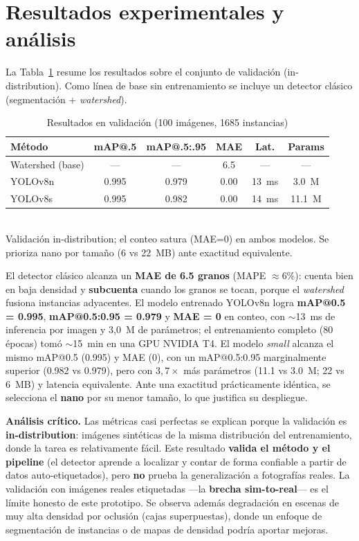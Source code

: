\documentclass[conference]{IEEEtran}
\begin{document}
\section{Resultados experimentales y análisis}
La Tabla~\ref{tab:res} resume los resultados sobre el conjunto de validación
(in-distribution). Como línea de base sin entrenamiento se incluye un detector
clásico (segmentación + \textit{watershed}).

\begin{table}[t]
\caption{Resultados en validación (100 imágenes, 1685 instancias)}
\label{tab:res}
\centering
\begin{tabular}{lccccc}
\toprule
\textbf{Método} & \textbf{mAP@.5} & \textbf{mAP@.5:.95} & \textbf{MAE} & \textbf{Lat.} & \textbf{Params} \\
\midrule
Watershed (base) & --- & --- & 6.5 & --- & --- \\
YOLOv8n & 0.995 & 0.979 & 0.00 & 13~ms & 3.0~M \\
YOLOv8s & 0.995 & 0.982 & 0.00 & 14~ms & 11.1~M \\
\bottomrule
\end{tabular}
\\[2pt]
\footnotesize Validación in-distribution; el conteo satura (MAE=0) en ambos
modelos. Se prioriza nano por tamaño (6 vs 22~MB) ante exactitud equivalente.
\end{table}

El detector clásico alcanza un \textbf{MAE de 6.5 granos} (MAPE $\approx$6\%):
cuenta bien en baja densidad y \textbf{subcuenta} cuando los granos se tocan,
porque el \textit{watershed} fusiona instancias adyacentes. El modelo entrenado
YOLOv8n logra \textbf{mAP@0.5 = 0.995}, \textbf{mAP@0.5:0.95 = 0.979} y
\textbf{MAE = 0} en conteo, con $\sim$13~ms de inferencia por imagen y 3{,}0~M de
parámetros; el entrenamiento completo (80 épocas) tomó $\sim$15~min en una GPU
NVIDIA T4. El modelo \textit{small} alcanza el mismo mAP@0.5 (0.995) y MAE (0), con un
mAP@0.5:0.95 marginalmente superior (0.982 vs 0.979), pero con $3{,}7\times$ más
parámetros (11.1 vs 3.0~M; 22 vs 6~MB) y latencia equivalente. Ante una exactitud
prácticamente idéntica, se selecciona el \textbf{nano} por su menor tamaño, lo que
justifica su despliegue.

\textbf{Análisis crítico.} Las métricas casi perfectas se explican porque la
validación es \textbf{in-distribution}: imágenes sintéticas de la misma
distribución del entrenamiento, donde la tarea es relativamente fácil. Este
resultado \textbf{valida el método y el pipeline} (el detector aprende a localizar
y contar de forma confiable a partir de datos auto-etiquetados), pero \textbf{no}
prueba la generalización a fotografías reales. La validación con imágenes reales
etiquetadas —la \textbf{brecha sim-to-real}— es el límite honesto de este
prototipo. Se observa además degradación en escenas de muy alta densidad por
oclusión (cajas superpuestas), donde un enfoque de segmentación de instancias o de
mapas de densidad podría aportar mejoras.
\end{document}
